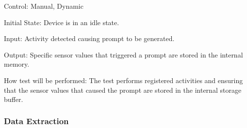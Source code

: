 \documentclass[12pt, titlepage]{article}
\begin{document}
\begin{enumerate}
		Control: Manual, Dynamic
							
		Initial State: Device is in an idle state.
							
		Input: Activity detected causing prompt to be generated.
		
		Output: Specific sensor values that triggered a prompt are stored in the internal memory.
							
		How test will be performed: The test performs registered activities and ensuring that the sensor values that caused the prompt are stored in the internal storage buffer.
\end{enumerate}

\newpage
\subsubsection{Data Extraction}
\end{document}

